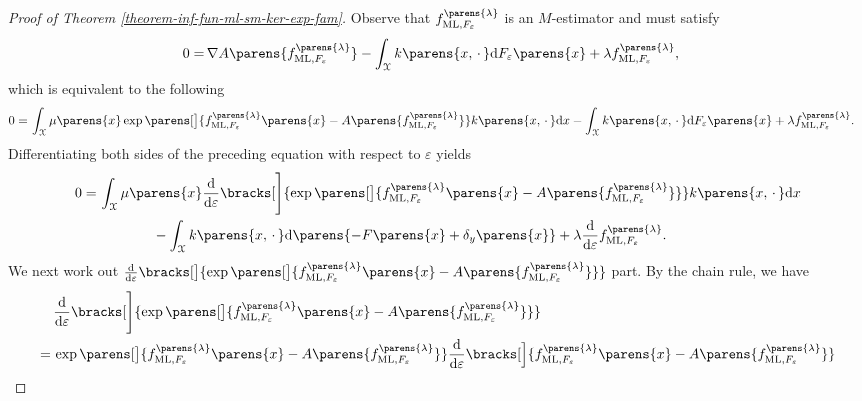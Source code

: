 \begin{proof}[Proof of Theorem \ref{theorem-inf-fun-ml-sm-ker-exp-fam}]
	Observe that $f_{\ML, F_{\varepsilon}}^{\parens{\lambda}}$ is an $M$-estimator and must satisfy 
	\begin{align*}
		0 = & \, \nabla A \parens{f_{\ML, F_{\varepsilon}}^{\parens{\lambda}}} - \int_{\calX} k \parens{x, \,\cdot\,} \diff F_{\varepsilon} \parens{x} + \lambda f_{\ML, F_{\varepsilon}}^{\parens{\lambda}}, 
	\end{align*}
	which is equivalent to the following 
	\begin{align*}
		0 = & \, \int_{\calX} \mu \parens{x} \exp \parens[\big]{f_{\ML, F_{\varepsilon}}^{\parens{\lambda}} \parens{x} - A \parens{f_{\ML, F_{\varepsilon}}^{\parens{\lambda}}}} k \parens{x, \,\cdot\,} \diff x - \int_{\calX} k \parens{x, \,\cdot\,} \diff F_{\varepsilon} \parens{x} + \lambda f_{\ML, F_{\varepsilon}}^{\parens{\lambda}}. 
	\end{align*}
	Differentiating both sides of the preceding equation with respect to $\varepsilon$ yields 
	\begin{align}
		0 = & \, \int_{\calX} \mu \parens{x} \frac{\diff}{\diff \varepsilon} \bracks[\Bigg]{\exp \parens[\big]{f_{\ML, F_{\varepsilon}}^{\parens{\lambda}} \parens{x} - A \parens{f_{\ML, F_{\varepsilon}}^{\parens{\lambda}}}} } k \parens{x, \,\cdot\,} \diff x \nonumber \\ 
		& \qquad \qquad - \int_{\calX} k \parens{x, \,\cdot\,} \diff \parens{- F \parens{x} + \delta_y \parens{x}} + \lambda \frac{\diff}{\diff \varepsilon} f_{\ML, F_{\varepsilon}}^{\parens{\lambda}}. \label{eq-theorem-inf-fun-ml-sm-ker-exp-fam-a-1}
	\end{align}
	We next work out $\frac{\diff}{\diff \varepsilon} \bracks[\big]{\exp \parens[\big]{f_{\ML, F_{\varepsilon}}^{\parens{\lambda}} \parens{x} - A \parens{f_{\ML, F_{\varepsilon}}^{\parens{\lambda}}}} }$ part. By the chain rule, we have 
	\begin{align*}
		& \, \frac{\diff}{\diff \varepsilon} \bracks[\Bigg]{\exp \parens[\big]{f_{\ML, F_{\varepsilon}}^{\parens{\lambda}} \parens{x} - A \parens{f_{\ML, F_{\varepsilon}}^{\parens{\lambda}}}} } \\ 
		= & \, \exp \parens[\big]{f_{\ML, F_{\varepsilon}}^{\parens{\lambda}} \parens{x} - A \parens{f_{\ML, F_{\varepsilon}}^{\parens{\lambda}}}} \frac{\diff}{\diff \varepsilon} \bracks[\Big]{ f_{\ML, F_{\varepsilon}}^{\parens{\lambda}} \parens{x} - A \parens{f_{\ML, F_{\varepsilon}}^{\parens{\lambda}}} }  \\ 

\end{align*}
\end{proof}
